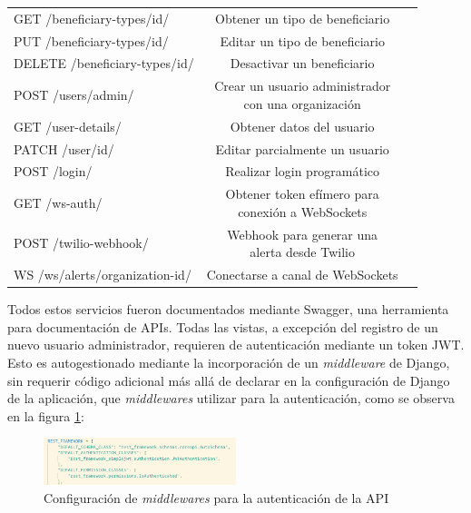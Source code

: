 \begin{table}[H]
\begin{tabular}{l c c}
		GET /beneficiary-types/{id}/ & Obtener un tipo de beneficiario \\
		PUT /beneficiary-types/{id}/ & Editar un tipo de beneficiario		\\
		DELETE /beneficiary-types/{id}/ & Desactivar un beneficiario \\
		\hline
		POST /users/admin/ & \makecell{Crear un usuario administrador \\ con una organización}  \\			
		GET /user-details/ & Obtener datos del usuario \\
		PATCH /user/{id}/ & Editar parcialmente un usuario \\
		\hline
		POST /login/ & Realizar login programático \\	
		GET /ws-auth/ & \makecell{Obtener token efímero para \\ conexión a WebSockets} \\
		POST /twilio-webhook/ & \makecell{Webhook para generar una \\ alerta desde Twilio} \\	
		WS /ws/alerts/organization-{id}/ & Conectarse a canal de WebSockets	\\
		\bottomrule
		\hline
	\end{tabular}
	\label{tab:endpoints}
\end{table}

Todos estos servicios fueron documentados mediante Swagger, una herramienta para documentación de APIs\citep{DJANGO:6}. Todas las vistas, a excepción del registro de un nuevo usuario administrador, requieren de autenticación mediante un token JWT. Esto es autogestionado mediante la incorporación de un \textit{middleware} de Django, sin requerir código adicional más allá de declarar en la configuración de Django de la aplicación, que \textit{middlewares} utilizar para la autenticación, como se observa en la figura \ref{backend:settings1}:

\begin{figure}[H]
	\centering
	\includegraphics[width=0.5\textwidth]{./Figures/backend-settings1.png}
	\caption{Configuración de \textit{middlewares} para la autenticación de la API}
	\label{backend:settings1}
\end{figure}



